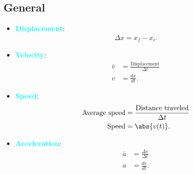 \documentclass{report}
\begin{document}
    \subsection{General}
    \begin{itemize}
        \item \textbf{\textcolor{cyan}{Displacement}}:
            \begin{align*}
                \Delta x = x_{f} - x_{i} 
            .\end{align*}
        \item \textbf{\textcolor{cyan}{Velocity}}:
            \begin{align*}
                \bar{v} &= \frac{\text{Displacement}}{\Delta t} \\
                v &= \frac{dx}{dt}
            .\end{align*}
        \item \textbf{\textcolor{cyan}{Speed}}:
            \begin{align*}
                \text{Average speed} &= \frac{\text{Distance traveled}}{\Delta t} \\
                \text{Speed} &= \abs{v(t)}
            .\end{align*}
        \item \textbf{\textcolor{cyan}{Acceleration}}:
            \begin{align*}
                \bar{a} &= \frac{\Delta v}{\Delta t}  \\
                a &= \frac{dv}{dt}
            .\end{align*}
    \end{itemize}
    \pagebreak 
\end{document}

